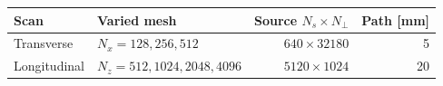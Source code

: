 \begin{tabular}{llrr}
\toprule
Scan & Varied mesh & Source $N_s\times N_\perp$ & Path [mm] \\
\midrule
Transverse & $N_x=128,256,512$ & $640\times32180$ & 5 \\
Longitudinal & $N_z=512,1024,2048,4096$ & $5120\times1024$ & 20 \\
\bottomrule
\end{tabular}
